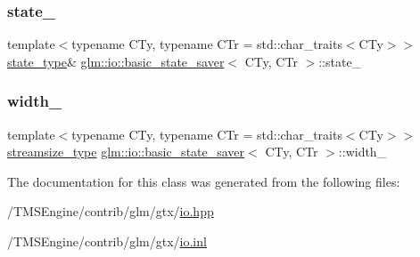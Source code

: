 \mbox{\label{classglm_1_1io_1_1basic__state__saver_a969e854089f2df42ee0050d38cc70903}} 
\subsubsection{\texorpdfstring{state\+\_\+}{state\_}}
{\footnotesize\ttfamily template$<$typename C\+Ty, typename C\+Tr = std\+::char\+\_\+traits$<$\+C\+Ty$>$$>$ \\
\hyperlink{classglm_1_1io_1_1basic__state__saver_a84787cc03192543bfe67ef25e7f20aa6}{state\+\_\+type}\& \hyperlink{classglm_1_1io_1_1basic__state__saver}{glm\+::io\+::basic\+\_\+state\+\_\+saver}$<$ C\+Ty, C\+Tr $>$\+::state\+\_\+\hspace{0.3cm}{\ttfamily [private]}}

\mbox{\label{classglm_1_1io_1_1basic__state__saver_a7c2f48c587295d3717b0b6790f78034d}} 
\subsubsection{\texorpdfstring{width\+\_\+}{width\_}}
{\footnotesize\ttfamily template$<$typename C\+Ty, typename C\+Tr = std\+::char\+\_\+traits$<$\+C\+Ty$>$$>$ \\
\hyperlink{classglm_1_1io_1_1basic__state__saver_a0a4c44df9a4fcf7531af6da7698e0931}{streamsize\+\_\+type} \hyperlink{classglm_1_1io_1_1basic__state__saver}{glm\+::io\+::basic\+\_\+state\+\_\+saver}$<$ C\+Ty, C\+Tr $>$\+::width\+\_\+\hspace{0.3cm}{\ttfamily [private]}}



The documentation for this class was generated from the following files\+:\begin{DoxyCompactItemize}
\item 
/\+T\+M\+S\+Engine/contrib/glm/gtx/\hyperlink{io_8hpp}{io.\+hpp}\item 
/\+T\+M\+S\+Engine/contrib/glm/gtx/\hyperlink{io_8inl}{io.\+inl}\end{DoxyCompactItemize}
